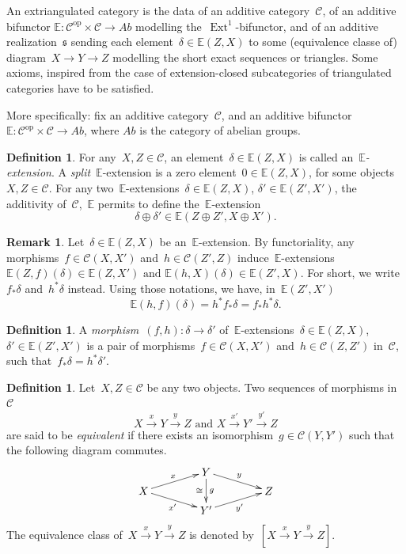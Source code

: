 \documentclass{amsart}
\theoremstyle{definition}
\newtheorem{definition}[theorem]{Definition}
\newtheorem{remark}[theorem]{Remark}
\newcommand{\darkblue}{\color{darkblue}} %
\newcommand{\defn}[1]{\textsl{\darkblue #1}} %
\newcommand{\cat}{\mathcal{C}}
\begin{document}
An extriangulated category is the data of an additive category~$\cat$, of an additive bifunctor ${\mathbb{E}:\cat^\mathrm{op}\times\cat\to \mathit{Ab}}$ modelling the~$\operatorname{Ext}^1$-bifunctor, and of an additive realization~$\mathfrak{s}$ sending each element~$\delta\in\mathbb{E}(Z,X)$ to some (equivalence classe of) diagram~$X\to Y\to Z$ modelling the short exact sequences or triangles.
Some axioms, inspired from the case of extension-closed subcategories of triangulated categories have to be satisfied.

More specifically: fix an additive category~$\cat$, and an additive bifunctor~$\mathbb{E}: \cat^\mathrm{op}\times\cat\to\mathit{Ab}$, where $\mathit{Ab}$ is the category of abelian groups.

\begin{definition}
For any~$X,Z\in\cat$, an element~$\delta\in\mathbb{E}(Z,X)$ is called an~\defn{$\mathbb{E}$-extension}.
A \defn{split}~$\mathbb{E}$-extension is a zero element~$0\in\mathbb{E}(Z,X)$, for some objects~$X,Z\in\cat$.
For any two~$\mathbb{E}$-exten\-sions~${\delta\in\mathbb{E}(Z,X)}$, $\delta'\in\mathbb{E}(Z',X')$, the additivity of~$\cat$,~$\mathbb{E}$ permits to define the~$\mathbb{E}$-extension
\[
\delta\oplus\delta'\in\mathbb{E}(Z\oplus Z',X\oplus X').
\]
\end{definition}

\begin{remark}
Let~$\delta\in\mathbb{E}(Z,X)$ be an~$\mathbb{E}$-extension. By functoriality, any morphisms~$f\in\cat(X,X')$ and~$h\in\cat(Z',Z)$ induce~$\mathbb{E}$-extensions~$\mathbb{E}(Z,f)(\delta)\in\mathbb{E}(Z,X') \text{ and } \mathbb{E}(h,X)(\delta)\in\mathbb{E}(Z',X)$.
For short, we write~$f_\ast\delta$ and~$h^\ast\delta$ instead.
Using those notations, we have, in~$\mathbb{E}(Z',X')$
\[
\mathbb{E}(h,f)(\delta)=h^\ast f_\ast\delta=f_\ast h^\ast\delta.
\]
\end{remark}

\begin{definition}
A \defn{morphism}~$(f,h):\delta\to\delta'$ of~$\mathbb{E}$-extensions~$\delta\in\mathbb{E}(Z,X)$,~$\delta'\in\mathbb{E}(Z',X')$ is a pair of morphisms~$f\in\cat(X,X')$ and~$h\in\cat(Z,Z')$ in~$\cat$, such that~$f_\ast\delta=h^\ast\delta'.$
\end{definition}

\begin{definition}
\label{DefSqEquiv}
Let~$X,Z\in\cat$ be any two objects. Two sequences of morphisms in~$\cat$
\[
X \overset{x}{\longrightarrow}Y\overset{y}{\longrightarrow}Z \text{ and } X\overset{x'}{\longrightarrow}Y'\overset{y'}{\longrightarrow}Z
\]
are said to be \defn{equivalent} if there exists an isomorphism~$g\in\cat(Y,Y')$ such that the following diagram commutes.
\[
\xy
(-20,0)*+{X}="X";
(5,0)*+{}="1";
(0,6)*+{Y}="Y";
(0,-6)*+{Y'}="Y'";
(-5,0)*+{}="2";
(20,0)*+{Z}="Z";
%
{\ar^{x} "X";"Y"};
{\ar^{y} "Y";"Z"};
{\ar_{x^{\prime}} "X";"Y'"};
{\ar_{y^{\prime}} "Y'";"Z"};
%
{\ar^{g}_{\cong} "Y";"Y'"};
%
{\ar@{}|{} "X";"1"};
{\ar@{}|{} "2";"Z"};
\endxy
\]
The equivalence class of~$X \xrightarrow{x} Y \xrightarrow{y} Z$ is denoted by~$[X \xrightarrow{x} Y \xrightarrow{y} Z]$.
\end{definition}
\end{document}
